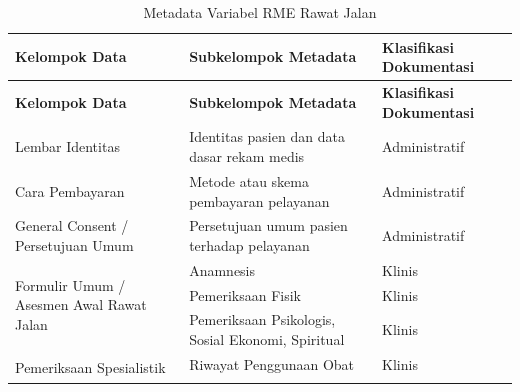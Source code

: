 \begin{longtable}{|p{4cm}|p{5.2cm}|p{3.2cm}|}
	\caption{Metadata Variabel RME Rawat Jalan}
	\label{tab:metadata-rme-rawat-jalan}                                                                  \\
	\hline
	\textbf{Kelompok Data}        &
	\textbf{Subkelompok Metadata} &
	\textbf{Klasifikasi Dokumentasi}                                                                      \\ \hline
	\endfirsthead

	\hline
	\textbf{Kelompok Data}        &
	\textbf{Subkelompok Metadata} &
	\textbf{Klasifikasi Dokumentasi}                                                                      \\ \hline
	\endhead

	Lembar Identitas
	                              & Identitas pasien dan data dasar rekam medis
	                              & Administratif                                                         \\ \hline

	Cara Pembayaran
	                              & Metode atau skema pembayaran pelayanan
	                              & Administratif                                                         \\ \hline

	General Consent / Persetujuan Umum
	                              & Persetujuan umum pasien terhadap pelayanan
	                              & Administratif                                                         \\ \hline

	\multirow{3}{4cm}{Formulir Umum / Asesmen Awal Rawat Jalan}
	                              & Anamnesis
	                              & Klinis                                                                \\ \cline{2-3}

	                              & Pemeriksaan Fisik
	                              & Klinis                                                                \\ \cline{2-3}

	                              & Pemeriksaan Psikologis, Sosial Ekonomi, Spiritual
	                              & Klinis                                                                \\ \hline

	\multirow{9}{4cm}{Pemeriksaan Spesialistik}
	                              & Riwayat Penggunaan Obat
	                              & Klinis                                                                \\ \cline{2-3}


\end{longtable}

